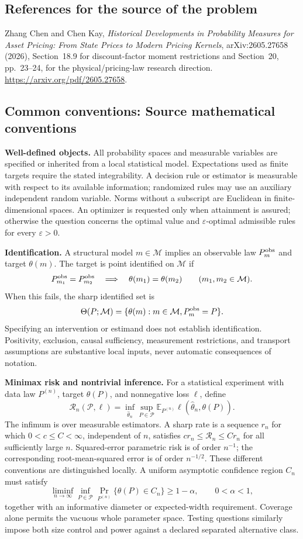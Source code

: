 \documentclass[11pt,a4paper]{article}
\newcommand{\E}{\mathbb E}
\begin{document}
\subsection*{References for the source of the problem}
Zhang Chen and Chen Kay, \emph{Historical Developments in Probability Measures for Asset Pricing: From State Prices to Modern Pricing Kernels}, arXiv:2605.27658 (2026), Section~18.9 for discount-factor moment restrictions and Section~20, pp.~23--24, for the physical/pricing-law research direction. \url{https://arxiv.org/pdf/2605.27658}.

\subsection*{Common conventions: Source mathematical conventions}

\textbf{Well-defined objects.}
All probability spaces and measurable variables are specified or inherited
from a local statistical model. Expectations used as finite targets require
the stated integrability. A decision rule or estimator is measurable with
respect to its available information; randomized rules may use an auxiliary
independent random variable. Norms without a subscript are Euclidean in
finite-dimensional spaces. An optimizer is requested only when attainment
is assured; otherwise the question concerns the optimal value and
$\varepsilon$-optimal admissible rules for every $\varepsilon>0$.

\textbf{Identification.}
A structural model $m\in\mathcal M$ implies an observable law
$P_m^{\rm obs}$ and target $\theta(m)$. The target is point identified on
$\mathcal M$ if
\[
 P_{m_1}^{\rm obs}=P_{m_2}^{\rm obs}
 \quad\Longrightarrow\quad\theta(m_1)=\theta(m_2)
 \qquad(m_1,m_2\in\mathcal M).
\]
When this fails, the sharp identified set is
\[
 \Theta(P;\mathcal M)=\{\theta(m):m\in\mathcal M,
                                  P_m^{\rm obs}=P\}.
\]
Specifying an intervention or estimand does not establish identification.
Positivity, exclusion, causal sufficiency, measurement restrictions, and
transport assumptions are substantive local inputs, never automatic
consequences of notation.

\textbf{Minimax risk and nontrivial inference.}
For a statistical experiment with data law $P^{(n)}$, target $\theta(P)$,
and nonnegative loss $\ell$, define
\[
 \mathcal R_n(\mathcal P,\ell)
   =\inf_{\widehat\theta_n}\sup_{P\in\mathcal P}
      \E_{P^{(n)}}\ell(\widehat\theta_n,\theta(P)).
\]
The infimum is over measurable estimators. A sharp rate is a sequence
$r_n$ for which $0<c\leq C<\infty$, independent of $n$, satisfies
$c r_n\leq\mathcal R_n\leq C r_n$ for all sufficiently large $n$.
Squared-error parametric risk is of order $n^{-1}$; the corresponding
root-mean-squared error is of order $n^{-1/2}$. These different conventions
are distinguished locally. A uniform asymptotic confidence region $C_n$
must satisfy
\[
 \liminf_{n\to\infty}\inf_{P\in\mathcal P}
     \Pr_{P^{(n)}}\{\theta(P)\in C_n\}\geq 1-\alpha,
 \qquad 0<\alpha<1,
\]
together with an informative diameter or expected-width requirement.
Coverage alone permits the vacuous whole parameter space. Testing questions
similarly impose both size control and power against a declared separated
alternative class.
\end{document}
